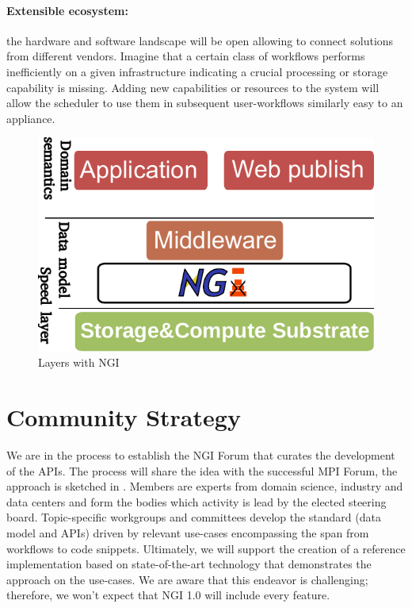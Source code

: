 \documentclass[a4paper, twocolumn]{article}
\begin{document}
\paragraph{Extensible ecosystem:}
the hardware and software landscape will be open allowing to connect solutions from different vendors.
Imagine that a certain class of workflows performs inefficiently on a given infrastructure indicating a crucial processing or storage capability is missing.
Adding new capabilities or resources to the system will allow the scheduler to use them in subsequent user-workflows similarly easy to an appliance.



\begin{figure}[b]
  \centering
  \includegraphics[width=0.75\columnwidth]{layers-ngi}
  \caption{Layers with NGI}
  \label{fig:ngilayers}
\end{figure}




\section{Community Strategy}

We are in the process to establish the NGI Forum that curates the development of the APIs.
The process will share the idea with the successful MPI Forum, the approach is sketched in .
Members are experts from domain science, industry and data centers and form the bodies
which activity is lead by the elected steering board.
Topic-specific workgroups and committees develop the standard (data model and APIs) driven by relevant use-cases encompassing the span from workflows to code snippets.
Ultimately, we will support the creation of a reference implementation based on state-of-the-art technology that demonstrates the approach on the use-cases.
We are aware that this endeavor is challenging; therefore, we won't expect that NGI 1.0 will include every feature.
\end{document}
